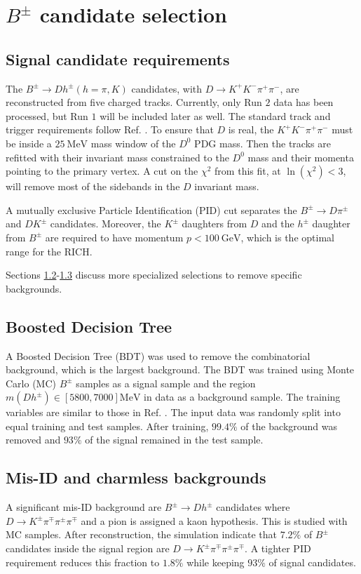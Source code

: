 \documentclass[12pt, a4paper, notitlepage, onecolumn]{article}
\numberwithin{equation}{section}
\begin{document}
\section{\texorpdfstring{$B^\pm$}{B} candidate selection}
\subsection{Signal candidate requirements}
\noindent The $B^\pm\to Dh^\pm (h = \pi, K)$ candidates, with $D\to K^+K^-\pi^+\pi^-$, are reconstructed from five charged tracks. Currently, only Run $2$ data has been processed, but Run $1$ will be included later as well. The standard track and trigger requirements follow Ref. \cite{cite_LHCbGGSZKSpipi}. To ensure that $D$ is real, the $K^+K^-\pi^+\pi^-$ must be inside a $\SI{25}{\mega\eV}$ mass window of the $D^0$ PDG mass. Then the tracks are refitted with their invariant mass constrained to the $D^0$ mass and their momenta pointing to the primary vertex. A cut on the $\chi^2$ from this fit, at $\ln(\chi^2) < 3$, will remove most of the sidebands in the $D$ invariant mass.

A mutually exclusive Particle Identification (PID) cut separates the $B^\pm\to D\pi^\pm$ and $DK^\pm$ candidates. Moreover, the $K^\pm$ daughters from $D$ and the $h^\pm$ daughter from $B^\pm$ are required to have momentum $p < \SI{100}{\giga\eV}$, which is the optimal range for the RICH.

Sections \ref{subsection_BDT}-\ref{subsection_charmless_misID} discuss more specialized selections to remove specific backgrounds.

\subsection{Boosted Decision Tree}
\label{subsection_BDT}
\noindent A Boosted Decision Tree (BDT) was used to remove the combinatorial background, which is the largest background. The BDT was trained using Monte Carlo (MC) $B^\pm$ samples as a signal sample and the region $m(Dh^\pm)\in[5800, 7000]\si{\mega\eV}$ in data as a background sample. The training variables are similar to those in Ref. \cite{cite_LHCbGGSZKSpipi}. The input data was randomly split into equal training and test samples. After training, $99.4\%$ of the background was removed and $93\%$ of the signal remained in the test sample.

\subsection{Mis-ID and charmless backgrounds}
\label{subsection_charmless_misID}
\noindent A significant mis-ID background are $B^\pm\to Dh^\pm$ candidates where $D\to K^\pm\pi^\mp\pi^\pm\pi^\mp$ and a pion is assigned a kaon hypothesis. This is studied with MC samples. After reconstruction, the simulation indicate that $7.2\%$ of $B^\pm$ candidates inside the signal region are $D\to K^\pm\pi^\mp\pi^\pm\pi^\mp$. A tighter PID requirement reduces this fraction to $1.8\%$ while keeping $93\%$ of signal candidates.
\end{document}
